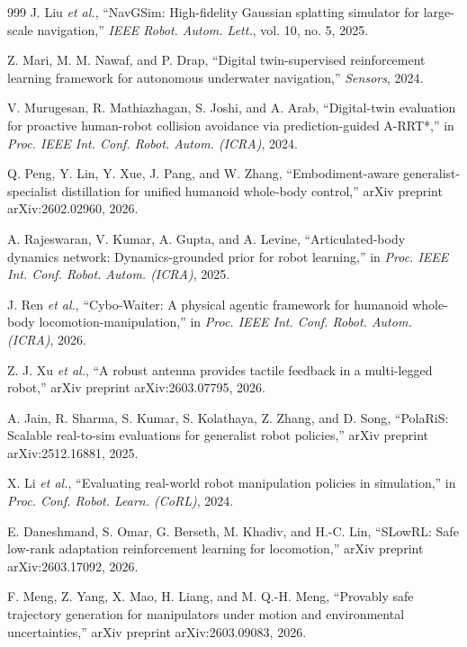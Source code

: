 \documentclass[12pt,a4paper,oneside]{report}
\begin{document}
\begin{thebibliography}{999}
J. Liu \textit{et al.}, ``{NavGSim}: High-fidelity Gaussian splatting simulator for large-scale navigation,'' \textit{IEEE Robot. Autom. Lett.}, vol. 10, no. 5, 2025.

Z. Mari, M. M. Nawaf, and P. Drap, ``Digital twin-supervised reinforcement learning framework for autonomous underwater navigation,'' \textit{Sensors}, 2024.

V. Murugesan, R. Mathiazhagan, S. Joshi, and A. Arab, ``Digital-twin evaluation for proactive human-robot collision avoidance via prediction-guided A-RRT*,'' in \textit{Proc. IEEE Int. Conf. Robot. Autom. (ICRA)}, 2024.

Q. Peng, Y. Lin, Y. Xue, J. Pang, and W. Zhang, ``Embodiment-aware generalist-specialist distillation for unified humanoid whole-body control,'' arXiv preprint arXiv:2602.02960, 2026.

A. Rajeswaran, V. Kumar, A. Gupta, and A. Levine, ``Articulated-body dynamics network: Dynamics-grounded prior for robot learning,'' in \textit{Proc. IEEE Int. Conf. Robot. Autom. (ICRA)}, 2025.

J. Ren \textit{et al.}, ``Cybo-Waiter: A physical agentic framework for humanoid whole-body locomotion-manipulation,'' in \textit{Proc. IEEE Int. Conf. Robot. Autom. (ICRA)}, 2026.

Z. J. Xu \textit{et al.}, ``A robust antenna provides tactile feedback in a multi-legged robot,'' arXiv preprint arXiv:2603.07795, 2026.

A. Jain, R. Sharma, S. Kumar, S. Kolathaya, Z. Zhang, and D. Song, ``{PolaRiS}: Scalable real-to-sim evaluations for generalist robot policies,'' arXiv preprint arXiv:2512.16881, 2025.

X. Li \textit{et al.}, ``Evaluating real-world robot manipulation policies in simulation,'' in \textit{Proc. Conf. Robot. Learn. (CoRL)}, 2024.

E. Daneshmand, S. Omar, G. Berseth, M. Khadiv, and H.-C. Lin, ``{SLowRL}: Safe low-rank adaptation reinforcement learning for locomotion,'' arXiv preprint arXiv:2603.17092, 2026.

F. Meng, Z. Yang, X. Mao, H. Liang, and M. Q.-H. Meng, ``Provably safe trajectory generation for manipulators under motion and environmental uncertainties,'' arXiv preprint arXiv:2603.09083, 2026.


\end{thebibliography}
\end{document}
